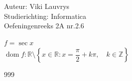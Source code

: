 \documentclass[a4paper]{article}
\begin{document}
  
\noindent \large Auteur: Viki Lauvrys \\
\noindent \large Studierichting: Informatica\\
\noindent \large Oefeningenreeks 2A nr.2.6\\

\medskip

\normalsize

$ f = \sec x $ \\

$\operatorname{dom} f: \mathbb{R} \setminus \left\{ x \in \mathbb{R} : x = \dfrac{\pi}{2} + k\pi, \quad k \in \mathbb{Z} \right\} $ \\

\begin{thebibliography}{999}
\end{thebibliography}
\end{document}
